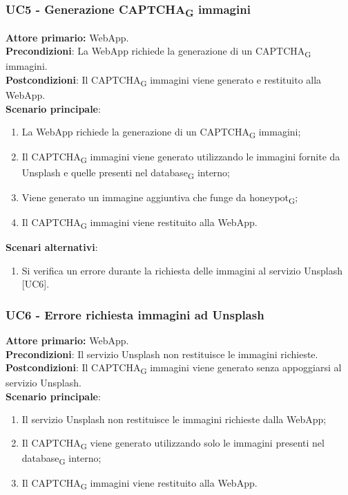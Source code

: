 \subsubsection{UC5 - Generazione CAPTCHA\textsubscript{G} immagini}
\textbf{Attore primario:} WebApp.\\
\textbf{Precondizioni}: La WebApp richiede la generazione di un CAPTCHA\textsubscript{G} immagini.\\
\textbf{Postcondizioni}: Il CAPTCHA\textsubscript{G} immagini viene generato e restituito alla WebApp.\\

\textbf{Scenario principale}:
\begin{enumerate}
    \item La WebApp richiede la generazione di un CAPTCHA\textsubscript{G} immagini;
    \item Il CAPTCHA\textsubscript{G} immagini viene generato utilizzando le immagini fornite da Unsplash e quelle presenti nel database\textsubscript{G} interno;
    \item Viene generato un immagine aggiuntiva che funge da honeypot\textsubscript{G};
    \item Il CAPTCHA\textsubscript{G} immagini viene restituito alla WebApp.
\end{enumerate}
\textbf{Scenari alternativi}:
\begin{enumerate}
    \item Si verifica un errore durante la richiesta delle immagini al servizio Unsplash [UC6].
\end{enumerate}

\subsubsection{UC6 - Errore richiesta immagini ad Unsplash}
\textbf{Attore primario:} WebApp.\\
\textbf{Precondizioni}: Il servizio Unsplash non restituisce le immagini richieste.\\
\textbf{Postcondizioni}: Il CAPTCHA\textsubscript{G} immagini viene generato senza appoggiarsi al servizio Unsplash.\\

\textbf{Scenario principale}:
\begin{enumerate}
    \item Il servizio Unsplash non restituisce le immagini richieste dalla WebApp;
    \item Il CAPTCHA\textsubscript{G} viene generato utilizzando solo le immagini presenti nel database\textsubscript{G} interno;
    \item Il CAPTCHA\textsubscript{G} immagini viene restituito alla WebApp.
\end{enumerate}

